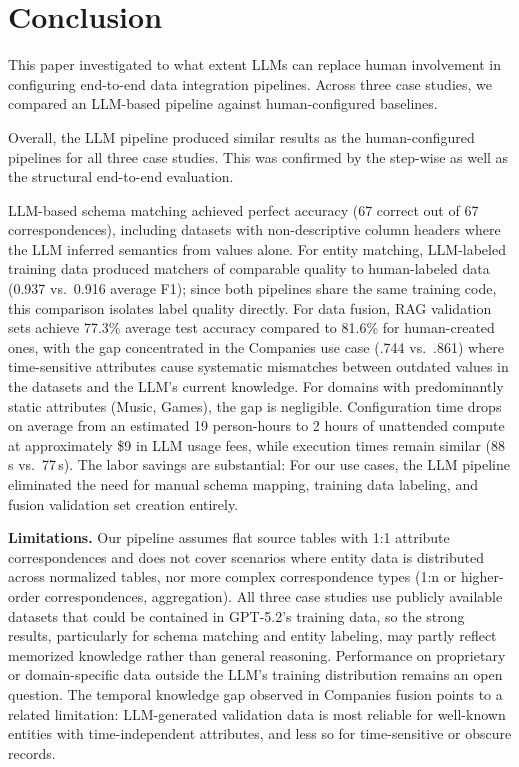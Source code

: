 \section{Conclusion}
\label{sec:conclusion}

This paper investigated to what extent LLMs can replace human involvement in configuring end-to-end data integration pipelines. Across three case studies, we compared an LLM-based pipeline against human-configured baselines.

Overall, the LLM pipeline produced similar results as the human-configured pipelines for all three case studies. This was confirmed by the step-wise as well as the structural end-to-end evaluation.  

LLM-based schema matching achieved perfect accuracy (67 correct out of 67 correspondences), including datasets with non-descriptive column headers where the LLM inferred semantics from values alone. For entity matching, LLM-labeled training data produced matchers of comparable quality to human-labeled data (0.937 vs.\ 0.916 average F1); since both pipelines share the same training code, this comparison isolates label quality directly. For data fusion, RAG validation sets achieve 77.3\% average test accuracy compared to 81.6\% for human-created ones, with the gap concentrated in the Companies use case (.744 vs.\ .861) where time-sensitive attributes cause systematic mismatches between outdated values in the datasets and the LLM's current knowledge. For domains with predominantly static attributes (Music, Games), the gap is negligible. Configuration time drops on average from an estimated 19 person-hours to 2 hours of unattended compute at approximately \$9 in LLM usage fees, while execution times remain similar (88\,s vs.\ 77\,s). The labor savings are substantial: For our use cases, the LLM pipeline eliminated the need for manual schema mapping, training data labeling, and fusion validation set creation entirely.

\textbf{Limitations.} Our pipeline assumes flat source tables with 1:1 attribute correspondences and does not cover scenarios where entity data is distributed across normalized tables, nor more complex correspondence types (1:n or higher-order correspondences, aggregation). All three case studies use publicly available datasets that could be contained in GPT-5.2's training data, so the strong results, particularly for schema matching and entity labeling, may partly reflect memorized knowledge rather than general reasoning. Performance on proprietary or domain-specific data outside the LLM's training distribution remains an open question. The temporal knowledge gap observed in Companies fusion points to a related limitation: LLM-generated validation data is most reliable for well-known entities with time-independent attributes, and less so for time-sensitive or obscure records. 

